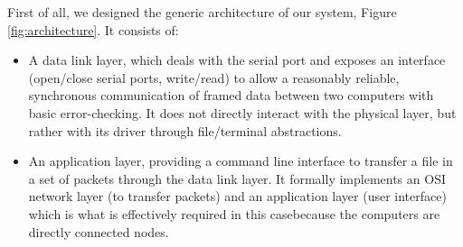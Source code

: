 \documentclass[a4paper, 11pt]{report}
\begin{document}
First of all, we designed the generic architecture of our system, Figure \ref{fig:architecture}. It consists of:
\begin{itemize}
	\itemsep0em
	\item A data link layer, which deals with the serial port and exposes an interface (open/close serial ports, write/read) to allow a reasonably reliable, synchronous communication of framed data between two computers with basic error-checking. It does not directly interact with the physical layer, but rather with its driver through file/terminal abstractions.
	\item An application layer, providing a command line interface to transfer a file in a set of packets through the data link layer. It formally implements an OSI network layer (to transfer packets) and an application layer (user interface) which is what is effectively required in this casebecause the computers are directly connected nodes.
\end{itemize}
\end{document}
